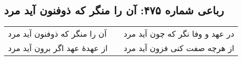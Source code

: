 \begin{center}
\section*{رباعی شماره ۴۷۵: آن را منگر که ذوفنون آید مرد}
\label{sec:0475}
\begin{longtable}{l p{0.5cm} r}
آن را منگر که ذوفنون آید مرد
&&
در عهد و وفا نگر که چون آید مرد
\\
از عهدهٔ عهد اگر برون آید مرد
&&
از هرچه صفت کنی فزون آید مرد
\\
\end{longtable}
\end{center}
